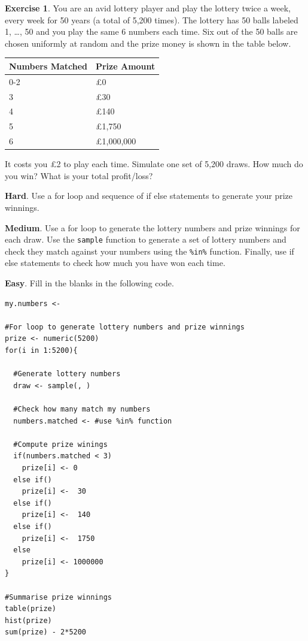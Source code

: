 \documentclass[
]{book}
\theoremstyle{definition}
\theoremstyle{definition}
\theoremstyle{definition}
\newtheorem{exercise}{Exercise}[chapter]
\theoremstyle{definition}
\theoremstyle{remark}
\begin{document}
\begin{exercise}

You are an avid lottery player and play the lottery twice a week, every week for 50 years (a total of 5,200 times). The lottery has 50 balls labeled 1, \ldots, 50 and you play the same 6 numbers each time. Six out of the 50 balls are chosen uniformly at random and the prize money is shown in the table below.

\begin{longtable}[]{@{}ll@{}}
\toprule()
Numbers Matched & Prize Amount \\
\midrule()
\endhead
0-2 & £0 \\
3 & £30 \\
4 & £140 \\
5 & £1,750 \\
6 & £1,000,000 \\
\bottomrule()
\end{longtable}

It costs you £2 to play each time. Simulate one set of 5,200 draws. How much do you win? What is your total profit/loss?

\textbf{Hard}. Use a for loop and sequence of if else statements to generate your prize winnings.

\textbf{Medium}. Use a for loop to generate the lottery numbers and prize winnings for each draw. Use the \texttt{sample} function to generate a set of lottery numbers and check they match against your numbers using the \texttt{\%in\%} function. Finally, use if else statements to check how much you have won each time.

\textbf{Easy}. Fill in the blanks in the following code.

\begin{verbatim}
my.numbers <- 

#For loop to generate lottery numbers and prize winnings
prize <- numeric(5200)
for(i in 1:5200){
  
  #Generate lottery numbers
  draw <- sample(, )
  
  #Check how many match my numbers
  numbers.matched <- #use %in% function
  
  #Compute prize winings
  if(numbers.matched < 3)
    prize[i] <- 0
  else if()
    prize[i] <-  30
  else if()
    prize[i] <-  140
  else if()
    prize[i] <-  1750
  else
    prize[i] <- 1000000
}

#Summarise prize winnings
table(prize)
hist(prize)
sum(prize) - 2*5200
\end{verbatim}

\end{exercise}
\end{document}
